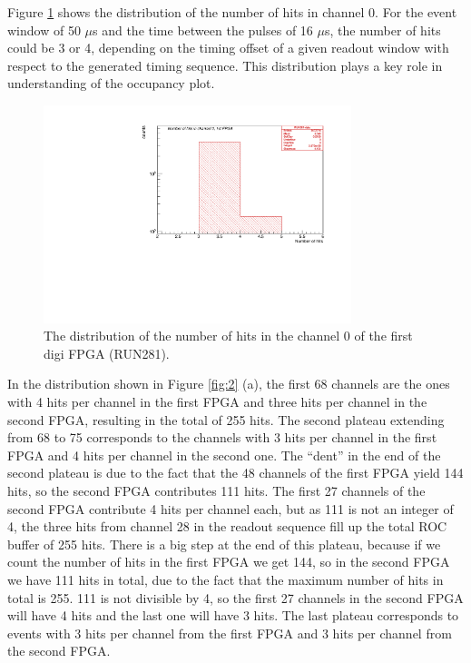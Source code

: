 Figure \ref{fig:66} shows the distribution of the number of hits in channel 0.
For the event window of 50 $\mu$s and the time between the pulses of 16 $\mu$s,
the number of hits could be 3 or 4,
depending on the timing offset of a given readout window with respect to the generated timing sequence.
This distribution plays a key role in understanding of the occupancy plot.
\begin{figure}[!h]
\centering
\includegraphics[width =0.8\textwidth]{figures/pdf/figure_00066_nhits_ch00_run281.pdf}
\caption{
  The distribution of the number of hits in the channel 0 of the first digi FPGA (RUN281).
}
\label{fig:66}
\end{figure}

In the distribution shown in Figure \ref{fig:2} (a),
the first 68 channels are the ones with 4 hits per channel in the first FPGA
and three hits per channel in the second FPGA, 
resulting in the total of 255 hits.
The second plateau extending from 68 to 75 corresponds to the channels
with 3 hits per channel in the first FPGA and 4 hits per channel in the second one.
  The ``dent'' in the end of the second plateau is due to the fact that the 48 channels of the first FPGA
  yield 144 hits, so the second FPGA contributes 111 hits. The first 27 channels of the second FPGA contribute
  4 hits per channel each, but as 111 is not an integer of 4, the three hits from channel 28 in the readout sequence
  fill up the total ROC buffer of 255 hits.
There is a big step at the end of this plateau, because if we count the number of hits
in the first FPGA we get 144, so in the second FPGA we have 111 hits in total,
due to the fact that the maximum number of hits in total is 255.
111 is not divisible by 4, so the first 27 channels in the second FPGA will have 4 hits
and the last one will have 3 hits.
The last plateau corresponds to events with 3 hits per channel from the first FPGA
and 3 hits per channel from the second FPGA.

